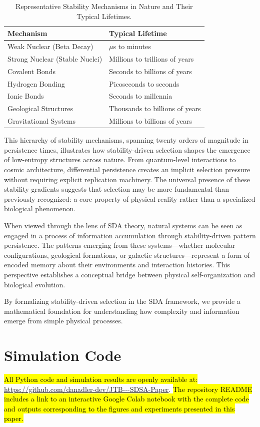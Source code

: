 \documentclass[preprint,12pt]{elsarticle}
\newcommand{\added}[1]{\hl{#1}}
\begin{document}
\begin{table}[H]
\centering
\caption{Representative Stability Mechanisms in Nature and Their Typical Lifetimes.}
\label{tab:binding-forces}
\footnotesize
\begin{tabular}{l l}
\toprule
\textbf{Mechanism} & \textbf{Typical Lifetime} \\
\midrule
Weak Nuclear (Beta Decay) & $\mu$s to minutes \\
Strong Nuclear (Stable Nuclei) & Millions to trillions of years \\
Covalent Bonds & Seconds to billions of years \\
Hydrogen Bonding & Picoseconds to seconds \\
Ionic Bonds & Seconds to millennia \\
Geological Structures & Thousands to billions of years \\
Gravitational Systems & Millions to billions of years \\
\bottomrule
\end{tabular}
\end{table}

This hierarchy of stability mechanisms, spanning twenty orders of magnitude in persistence times, illustrates how stability-driven selection shapes the emergence of low-entropy structures across nature. From quantum-level interactions to cosmic architecture, differential persistence creates an implicit selection pressure without requiring explicit replication machinery. The universal presence of these stability gradients suggests that selection may be more fundamental than previously recognized: a core property of physical reality rather than a specialized biological phenomenon.

When viewed through the lens of SDA theory, natural systems can be seen as engaged in a process of information accumulation through stability-driven pattern persistence. The patterns emerging from these systems—whether molecular configurations, geological formations, or galactic structures—represent a form of encoded memory about their environments and interaction histories. This perspective establishes a conceptual bridge between physical self-organization and biological evolution.

By formalizing stability-driven selection in the SDA framework, we provide a mathematical foundation for understanding how complexity and information emerge from simple physical processes.

\section{Simulation Code}

\added{All Python code and simulation results are openly available at:} 
\url{https://github.com/danadler-dev/JTB---SDSA-Paper}. 
\added{The repository README includes a link to an interactive Google Colab notebook  with the complete code and outputs corresponding to the figures and experiments presented in this paper.}
\end{document}
